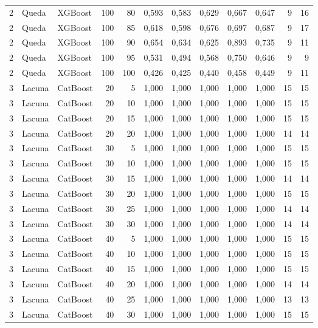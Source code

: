 \begin{longtable}{@{}rllrrrrrrrrr@{}}
2 & Queda & XGBoost & 100 & 80 & 0,593 & 0,583 & 0,629 & 0,667 & 0,647 & 9 & 16 \\
2 & Queda & XGBoost & 100 & 85 & 0,618 & 0,598 & 0,676 & 0,697 & 0,687 & 9 & 17 \\
2 & Queda & XGBoost & 100 & 90 & 0,654 & 0,634 & 0,625 & 0,893 & 0,735 & 9 & 11 \\
2 & Queda & XGBoost & 100 & 95 & 0,531 & 0,494 & 0,568 & 0,750 & 0,646 & 9 & 9 \\
2 & Queda & XGBoost & 100 & 100 & 0,426 & 0,425 & 0,440 & 0,458 & 0,449 & 9 & 11 \\
3 & Lacuna & CatBoost & 20 & 5 & 1,000 & 1,000 & 1,000 & 1,000 & 1,000 & 15 & 15 \\
3 & Lacuna & CatBoost & 20 & 10 & 1,000 & 1,000 & 1,000 & 1,000 & 1,000 & 15 & 15 \\
3 & Lacuna & CatBoost & 20 & 15 & 1,000 & 1,000 & 1,000 & 1,000 & 1,000 & 15 & 15 \\
3 & Lacuna & CatBoost & 20 & 20 & 1,000 & 1,000 & 1,000 & 1,000 & 1,000 & 14 & 14 \\
3 & Lacuna & CatBoost & 30 & 5 & 1,000 & 1,000 & 1,000 & 1,000 & 1,000 & 15 & 15 \\
3 & Lacuna & CatBoost & 30 & 10 & 1,000 & 1,000 & 1,000 & 1,000 & 1,000 & 15 & 15 \\
3 & Lacuna & CatBoost & 30 & 15 & 1,000 & 1,000 & 1,000 & 1,000 & 1,000 & 14 & 14 \\
3 & Lacuna & CatBoost & 30 & 20 & 1,000 & 1,000 & 1,000 & 1,000 & 1,000 & 15 & 15 \\
3 & Lacuna & CatBoost & 30 & 25 & 1,000 & 1,000 & 1,000 & 1,000 & 1,000 & 14 & 14 \\
3 & Lacuna & CatBoost & 30 & 30 & 1,000 & 1,000 & 1,000 & 1,000 & 1,000 & 14 & 14 \\
3 & Lacuna & CatBoost & 40 & 5 & 1,000 & 1,000 & 1,000 & 1,000 & 1,000 & 15 & 15 \\
3 & Lacuna & CatBoost & 40 & 10 & 1,000 & 1,000 & 1,000 & 1,000 & 1,000 & 15 & 15 \\
3 & Lacuna & CatBoost & 40 & 15 & 1,000 & 1,000 & 1,000 & 1,000 & 1,000 & 15 & 15 \\
3 & Lacuna & CatBoost & 40 & 20 & 1,000 & 1,000 & 1,000 & 1,000 & 1,000 & 14 & 14 \\
3 & Lacuna & CatBoost & 40 & 25 & 1,000 & 1,000 & 1,000 & 1,000 & 1,000 & 13 & 13 \\
3 & Lacuna & CatBoost & 40 & 30 & 1,000 & 1,000 & 1,000 & 1,000 & 1,000 & 15 & 15 \\

\end{longtable}
